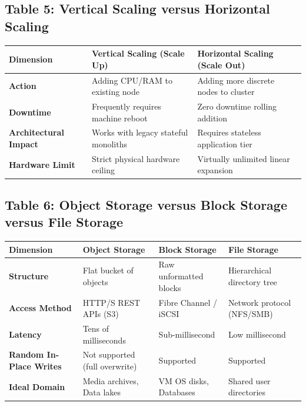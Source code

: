 \subsection*{Table 5: Vertical Scaling versus Horizontal Scaling}
\begin{center}
\small
\begin{tabularx}{\textwidth}{lXX}
\toprule
\textbf{Dimension} & \textbf{Vertical Scaling (Scale Up)} & \textbf{Horizontal Scaling (Scale Out)} \\
\midrule
\textbf{Action} & Adding CPU/RAM to existing node & Adding more discrete nodes to cluster \\
\textbf{Downtime} & Frequently requires machine reboot & Zero downtime rolling addition \\
\textbf{Architectural Impact} & Works with legacy stateful monoliths & Requires stateless application tier \\
\textbf{Hardware Limit} & Strict physical hardware ceiling & Virtually unlimited linear expansion \\
\bottomrule
\end{tabularx}
\end{center}

\subsection*{Table 6: Object Storage versus Block Storage versus File Storage}
\begin{center}
\small
\begin{tabularx}{\textwidth}{lXXX}
\toprule
\textbf{Dimension} & \textbf{Object Storage} & \textbf{Block Storage} & \textbf{File Storage} \\
\midrule
\textbf{Structure} & Flat bucket of objects & Raw unformatted blocks & Hierarchical directory tree \\
\textbf{Access Method} & HTTP/S REST APIs (S3) & Fibre Channel / iSCSI & Network protocol (NFS/SMB) \\
\textbf{Latency} & Tens of milliseconds & Sub-millisecond & Low millisecond \\
\textbf{Random In-Place Writes} & Not supported (full overwrite) & Supported & Supported \\
\textbf{Ideal Domain} & Media archives, Data lakes & VM OS disks, Databases & Shared user directories \\
\bottomrule
\end{tabularx}
\end{center}


